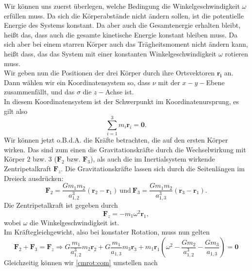 \begin{Answer}[ref = cmrot]
	Wir können uns zuerst überlegen, welche Bedingung die Winkelgeschwindigkeit $\omega$ erfüllen muss. Da sich die Körperabstände nicht ändern sollen, ist die potentielle Energie des Systems konstant. Da aber auch die Gesamtenergie erhalten bleibt, heißt das, dass auch die gesamte kinetische Energie konstant bleiben muss. Da sich aber bei einem starren Körper auch das Trägheitsmoment nicht ändern kann, heißt dass, das das System mit einer konstanten Winkelgeschwindigkeit $\omega$ rotieren muss.\\
	Wir geben nun die Positionen der drei Körper durch ihre Ortsvektoren $\mathbf{r_i}$ an. Dann wählen wir ein Koordinatensystem so, dass $\nu$ mit der $x-y-$Ebene zusammenfällt, und das $\sigma$ die $z-$Achse ist.\\
	In diesem Koordinatensystem ist der Schwerpunkt im Koordinatenursprung, es gilt also
	\begin{equation}\label{cmrot:com}
		\sum_{i=1}^{3} m_i\mathbf{r}_i = \mathbf{0}.
	\end{equation}
	Wir können jetzt o.B.d.A. die Kräfte betrachten, die auf den ersten Körper wirken. Das sind zum einen die Gravitationskräfte durch die Wechselwirkung mit Körper $2$ bzw. $3$ ($\mathbf{F}_{2}$ bzw. $\mathbf{F}_{3}$), als auch die im Inertialsystem wirkende Zentripetalkraft $\mathbf{F}_{z}$. Die Gravitationskräfte lassen sich durch die Seitenlängen im Dreieck ausdrücken:
	\begin{equation}\label{cmrot:grav}
		\mathbf{F}_2 = \frac{Gm_1m_2}{a_{1,2}^3}\left(\mathbf{r}_2-\mathbf{r}_1\right)~\mathrm{und}~\mathbf{F}_3 = \frac{Gm_1m_2}{a_{1,3}^3}\left(\mathbf{r}_3-\mathbf{r}_1\right).
	\end{equation}
	Die Zentripetalkraft ist gegeben durch
	\begin{equation}\label{cmrot:rot}
		\mathbf{F}_z = -m_1 \omega^2 \mathbf{r}_1,
	\end{equation}
	wobei $\omega$ die Winkelgeschwindigkeit ist.\\
	Im Kräftegleichgewicht, also bei konstater Rotation, muss nun gelten
	\begin{equation}\label{cmrot:fbal}
		\mathbf{F}_2 + \mathbf{F}_3 = \mathbf{F}_{z} \Rightarrow G \frac{m_1}{a_{1,2}^3} m_2 \mathbf{r}_2 + G \frac{m_1}{a_{1,3}}m_3\mathbf{r}_{3} + m_1 \mathbf{r}_1 \left(\omega^2 - \frac{Gm_2}{a_{1,2}^3} - \frac{Gm_3}{a_{1,3}}\right) = \mathbf{0}
	\end{equation}
	Gleichzeitig können wir \eqref{cmrot:com} umstellen nach

\end{Answer}

